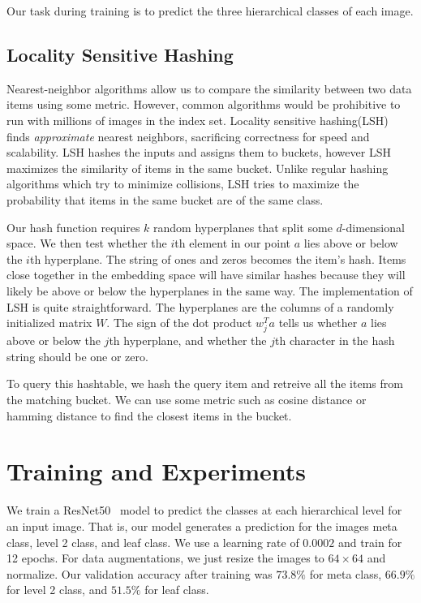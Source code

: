 \documentclass[conference]{IEEEtran}
\begin{document}
Our task during training is to predict the three hierarchical classes of each image.

\subsection{Locality Sensitive Hashing}
Nearest-neighbor algorithms allow us to compare the similarity between two data items using some 
metric.
However, common algorithms would be prohibitive to run with millions of images in the index set.
Locality sensitive hashing(LSH)~\cite{rajaraman2011mining}~\cite{agrawal2019finding}~\cite{yona2018fast}~\cite{gupta2018locality}
finds \emph{approximate} nearest neighbors, sacrificing correctness for speed and scalability.
LSH hashes the inputs and assigns them to buckets, however LSH maximizes
the similarity of items in the same bucket.
Unlike regular hashing algorithms which try to minimize collisions, 
LSH tries to maximize the probability that items in the same bucket are of the 
same class.

Our hash function requires $k$ random hyperplanes that split some $d$-dimensional
space.
We then test whether the $i$th element in our point $a$ lies above or below the
$i$th hyperplane.
The string of ones and zeros becomes the item's hash.
Items close together in the embedding space will have similar hashes because they will
likely be above or below the hyperplanes in the same way.
The implementation of LSH is quite straightforward.
The hyperplanes are the columns of a randomly initialized matrix $W$.
The sign of the dot product $w_{j}^Ta$ tells us whether $a$ lies above
or below the $j$th hyperplane, and whether the $j$th character in the hash
string should be one or zero.

To query this hashtable, we hash the query item and retreive
all the items from the matching bucket.
We can use some metric such as cosine distance or hamming distance
to find the closest items in the bucket.

\section{Training and Experiments}
\label{sec:training}
We train a ResNet50~\cite{he2016deep} model to predict the classes at each 
hierarchical level for an input image.
That is, our model generates a prediction for the images meta class, level 2
class, and leaf class.
We use a learning rate of $0.0002$ and train for 12 epochs.
For data augmentations, we just resize the images to $64\times64$ and 
normalize.
Our validation accuracy after training was $73.8\%$ for meta class,
$66.9\%$ for level 2 class, and $51.5\%$ for leaf class.
\end{document}
